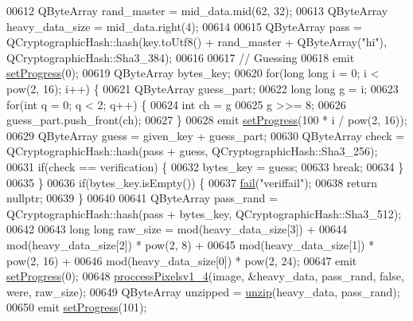 \begin{DoxyCode}
00612     QByteArray rand\_master = mid\_data.mid(62, 32);
00613     QByteArray heavy\_data\_size = mid\_data.right(4);
00614 
00615     QByteArray pass = QCryptographicHash::hash(key.toUtf8() + rand\_master + QByteArray(\textcolor{stringliteral}{"hi"}), 
      QCryptographicHash::Sha3\_384);
00616 
00617     \textcolor{comment}{// Guessing}
00618     emit \hyperlink{class_model_p_c_afdcd80f0ed5062e145a71f09b0897547}{setProgress}(0);
00619     QByteArray bytes\_key;
00620     \textcolor{keywordflow}{for}(\textcolor{keywordtype}{long} \textcolor{keywordtype}{long} i = 0; i < pow(2, 16); i++) \{
00621         QByteArray guess\_part;
00622         \textcolor{keywordtype}{long} \textcolor{keywordtype}{long} g = i;
00623         \textcolor{keywordflow}{for}(\textcolor{keywordtype}{int} q = 0; q < 2; q++) \{
00624                 \textcolor{keywordtype}{int} ch = g %
00625                 g >>= 8;
00626                 guess\_part.push\_front(ch);
00627             \}
00628         emit \hyperlink{class_model_p_c_afdcd80f0ed5062e145a71f09b0897547}{setProgress}(100 * i / pow(2, 16));
00629         QByteArray guess = given\_key + guess\_part;
00630         QByteArray check = QCryptographicHash::hash(pass + guess, QCryptographicHash::Sha3\_256);
00631         \textcolor{keywordflow}{if}(check == verification) \{
00632             bytes\_key = guess;
00633             \textcolor{keywordflow}{break};
00634         \}
00635     \}
00636     \textcolor{keywordflow}{if}(bytes\_key.isEmpty()) \{
00637         \hyperlink{class_model_p_c_a47464b59b7e37fcee25e55475708aabd}{fail}(\textcolor{stringliteral}{"veriffail"});
00638         \textcolor{keywordflow}{return} \textcolor{keyword}{nullptr};
00639     \}
00640 
00641     QByteArray pass\_rand = QCryptographicHash::hash(pass + bytes\_key, QCryptographicHash::Sha3\_512);
00642 
00643     \textcolor{keywordtype}{long} \textcolor{keywordtype}{long} raw\_size = mod(heavy\_data\_size[3]) +
00644             mod(heavy\_data\_size[2]) * pow(2, 8) +
00645             mod(heavy\_data\_size[1]) * pow(2, 16) +
00646             mod(heavy\_data\_size[0]) * pow(2, 24);
00647     emit \hyperlink{class_model_p_c_afdcd80f0ed5062e145a71f09b0897547}{setProgress}(0);
00648     \hyperlink{class_model_p_c_a5cdb4d1d61ff62ee9d45b496a7dbf1fb}{proccessPixelsv1\_4}(image, &heavy\_data, pass\_rand, \textcolor{keyword}{false}, were, raw\_size);
00649     QByteArray unzipped = \hyperlink{class_model_p_c_a6da88f166785a49f73b22c169f956fd0}{unzip}(heavy\_data, pass\_rand);
00650     emit \hyperlink{class_model_p_c_afdcd80f0ed5062e145a71f09b0897547}{setProgress}(101);

\end{DoxyCode}
